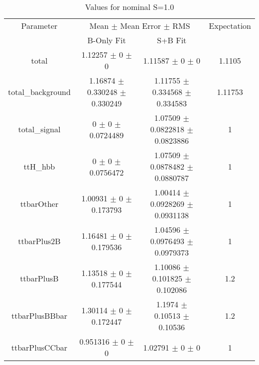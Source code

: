 \begin{table}
\centering
\caption{Values for nominal S=1.0}
\begin{tabular}{cccc}
\toprule
Parameter & \multicolumn{2}{c}{Mean $\pm$ Mean Error $\pm$ RMS} & Expectation\\
 & B-Only Fit & S+B Fit & \\
\midrule
total & \num{1.12257} $\pm$ \num{0} $\pm$ \num{0} & \num{1.11587} $\pm$ \num{0} $\pm$ \num{0} & \num{1.1105}\\
total\_background & \num{1.16874} $\pm$ \num{0.330248} $\pm$ \num{0.330249} & \num{1.11755} $\pm$ \num{0.334568} $\pm$ \num{0.334583} & \num{1.11753}\\
total\_signal & \num{0} $\pm$ \num{0} $\pm$ \num{0.0724489} & \num{1.07509} $\pm$ \num{0.0822818} $\pm$ \num{0.0823886} & \num{1}\\
ttH\_hbb & \num{0} $\pm$ \num{0} $\pm$ \num{0.0756472} & \num{1.07509} $\pm$ \num{0.0878482} $\pm$ \num{0.0880787} & \num{1}\\
ttbarOther & \num{1.00931} $\pm$ \num{0} $\pm$ \num{0.173793} & \num{1.00414} $\pm$ \num{0.0928269} $\pm$ \num{0.0931138} & \num{1}\\
ttbarPlus2B & \num{1.16481} $\pm$ \num{0} $\pm$ \num{0.179536} & \num{1.04596} $\pm$ \num{0.0976493} $\pm$ \num{0.0979373} & \num{1}\\
ttbarPlusB & \num{1.13518} $\pm$ \num{0} $\pm$ \num{0.177544} & \num{1.10086} $\pm$ \num{0.101825} $\pm$ \num{0.102086} & \num{1.2}\\
ttbarPlusBBbar & \num{1.30114} $\pm$ \num{0} $\pm$ \num{0.172447} & \num{1.1974} $\pm$ \num{0.10513} $\pm$ \num{0.10536} & \num{1.2}\\
ttbarPlusCCbar & \num{0.951316} $\pm$ \num{0} $\pm$ \num{0} & \num{1.02791} $\pm$ \num{0} $\pm$ \num{0} & \num{1}\\
\bottomrule
\end{tabular}
\end{table}